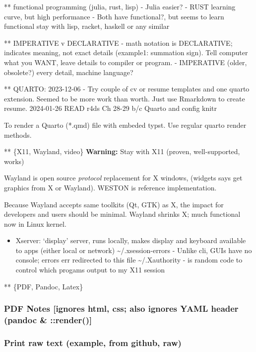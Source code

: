 \documentclass[
  letterpaper,
  DIV=11,
  numbers=noendperiod]{scrartcl}
\providecommand{\tightlist}{%
  \setlength{\itemsep}{0pt}\setlength{\parskip}{0pt}}\usepackage{longtable,booktabs,array}
\begin{document}
** functional programming (julia, rust, lisp) - Julia easier? - RUST
learning curve, but high performance - Both have functional?, but seems
to learn functional stay with lisp, racket, haskell or any similar

** IMPERATIVE v DECLARATIVE - math notation is DECLARATIVE; indicates
meaning, not exact details (example1: summation sign). Tell computer
what you WANT, leave details to compiler or program. - IMPERATIVE
(older, obsolete?) every detail, machine language?

** QUARTO: 2023-12-06 - Try couple of cv or resume templates and one
quarto extension. Seemed to be more work than worth. Just use Rmarkdown
to create resume. 2024-01-26 READ r4ds Ch 28-29 b/c Quarto and config
knitr

To render a Quarto (*.qmd) file with embeded typst. Use regular quarto
render methods.

** \{X11, Wayland, video\} \textbf{Warning:} Stay with X11 (proven,
well-supported, works)

Wayland is open source \emph{protocol} replacement for X windows,
(widgets says get graphics from X or Wayland). WESTON is reference
implementation.

Because Wayland accepts same toolkits (Qt, GTK) as X, the impact for
developers and users should be minimal. Wayland shrinks X; much
functional now in Linux kernel.

\begin{itemize}
\tightlist
\item
  Xserver: `display' server, runs locally, makes display and keyboard
  available to apps (either local or network)
  \textasciitilde/.xsession-errors - Unlike cli, GUIs have no console;
  errors err redirected to this file \textasciitilde/.Xauthority - is
  random code to control which progams output to my X11 session
\end{itemize}

** \{PDF, Pandoc, Latex\}

\subsubsection{PDF Notes {[}ignores html, css; also ignores YAML header
(pandoc \&
::render(){]}}\label{pdf-notes-ignores-html-css-also-ignores-yaml-header-pandoc-render}

\subsubsection{Print raw text (example, from github,
raw)}\label{print-raw-text-example-from-github-raw}
\end{document}

